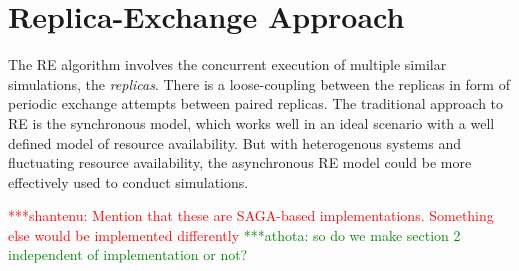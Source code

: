 \documentclass{rspublic}
\newcommand{\jhanote}[1]{ {\textcolor{red} { ***shantenu: #1 }}}
\newcommand{\alnote}[1]{ {\textcolor{blue} { ***andre: #1 }}}
\newcommand{\athotanote}[1]{ {\textcolor{green} { ***athota: #1 }}}
\newcommand{\alnote}[1]{}
\newcommand{\athotanote}[1]{}
\newcommand{\jhanote}[1]{}
\begin{document}
\section{Replica-Exchange Approach}
\label{sec:repex-approach}
The RE algorithm involves the concurrent execution of multiple similar
simulations, the \emph{replicas}.  There is a loose-coupling between
the replicas in form of periodic exchange attempts between paired
replicas. The traditional approach to RE is the synchronous model,
which works well in an ideal scenario with a well defined model of
resource availability. But with heterogenous systems and fluctuating
resource availability, the asynchronous RE model could be more
effectively used to conduct simulations.





\jhanote{Mention that these are SAGA-based implementations. Something
  else would be implemented differently}
 \athotanote{so do we make section 2 independent of implementation or not?}
\end{document}
